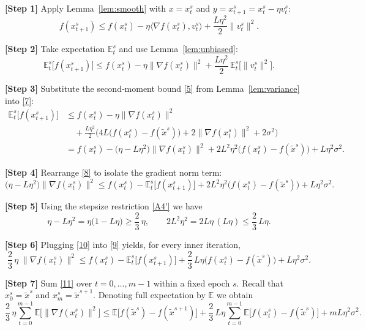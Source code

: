 \documentclass{article}
\begin{document}
\noindent\textbf{[Step 1]} Apply Lemma~\ref{lem:smooth} with $x=x_{t}^{s}$ and $y=x_{t+1}^{s}=x_{t}^{s}-\eta v_{t}^{s}$:
\[
f(x_{t+1}^{s})\le f(x_{t}^{s})-\eta\langle \nabla f(x_{t}^{s}),v_{t}^{s}\rangle+\frac{L\eta^{2}}{2}\|v_{t}^{s}\|^{2}.
\tag{6}
\]

\noindent\textbf{[Step 2]} Take expectation $\mathbb{E}_{t}^{s}$ and use Lemma~\ref{lem:unbiased}:
\[
\mathbb{E}_{t}^{s}\big[f(x_{t+1}^{s})\big]\le
f(x_{t}^{s})-\eta\|\nabla f(x_{t}^{s})\|^{2}
+\frac{L\eta^{2}}{2}\,\mathbb{E}_{t}^{s}\!\big[\|v_{t}^{s}\|^{2}\big].
\tag{7}
\]

\noindent\textbf{[Step 3]} Substitute the second‑moment bound \eqref{5} from Lemma~\ref{lem:variance} into \eqref{7}:
\[
\begin{aligned}
\mathbb{E}_{t}^{s}\big[f(x_{t+1}^{s})\big]
&\le f(x_{t}^{s})-\eta\|\nabla f(x_{t}^{s})\|^{2}\\
&\quad+\frac{L\eta^{2}}{2}\Big(4L\big(f(x_{t}^{s})-f(\tilde{x}^{s})\big)
      +2\|\nabla f(x_{t}^{s})\|^{2}+2\sigma^{2}\Big)\\[2mm]
&= f(x_{t}^{s})-\big(\eta-L\eta^{2}\big)\|\nabla f(x_{t}^{s})\|^{2}
   +2L^{2}\eta^{2}\big(f(x_{t}^{s})-f(\tilde{x}^{s})\big)
   +L\eta^{2}\sigma^{2}.
\end{aligned}
\tag{8}
\]

\noindent\textbf{[Step 4]} Rearrange \eqref{8} to isolate the gradient norm term:
\[
\big(\eta-L\eta^{2}\big)\|\nabla f(x_{t}^{s})\|^{2}
\le f(x_{t}^{s})-\mathbb{E}_{t}^{s}\big[f(x_{t+1}^{s})\big]
   +2L^{2}\eta^{2}\big(f(x_{t}^{s})-f(\tilde{x}^{s})\big)
   +L\eta^{2}\sigma^{2}.
\tag{9}
\]

\noindent\textbf{[Step 5]} Using the stepsize restriction \eqref{A4'} we have
\[
\eta-L\eta^{2}= \eta\big(1-L\eta\big)\ge \frac{2}{3}\,\eta,
\qquad
2L^{2}\eta^{2}=2L\eta\,(L\eta)\le \frac{2}{3}\,L\eta .
\tag{10}
\]

\noindent\textbf{[Step 6]} Plugging \eqref{10} into \eqref{9} yields, for every inner iteration,
\[
\frac{2}{3}\,\eta\;\|\nabla f(x_{t}^{s})\|^{2}
\le f(x_{t}^{s})-\mathbb{E}_{t}^{s}\big[f(x_{t+1}^{s})\big]
   +\frac{2}{3}\,L\eta\big(f(x_{t}^{s})-f(\tilde{x}^{s})\big)
   +L\eta^{2}\sigma^{2}.
\tag{11}
\]

\noindent\textbf{[Step 7]} Sum \eqref{11} over $t=0,\dots,m-1$ within a fixed epoch $s$.
Recall that $x_{0}^{s}=\tilde{x}^{s}$ and $x_{m}^{s}=\tilde{x}^{s+1}$.
Denoting full expectation by $\mathbb{E}$ we obtain
\[
\frac{2}{3}\,\eta\sum_{t=0}^{m-1}\mathbb{E}\big[\|\nabla f(x_{t}^{s})\|^{2}\big]
\le
\mathbb{E}\big[f(\tilde{x}^{s})-f(\tilde{x}^{s+1})\big]
   +\frac{2}{3}\,L\eta\sum_{t=0}^{m-1}\mathbb{E}\big[f(x_{t}^{s})-f(\tilde{x}^{s})\big]
   +mL\eta^{2}\sigma^{2}.
\tag{12}
\]
\end{document}
